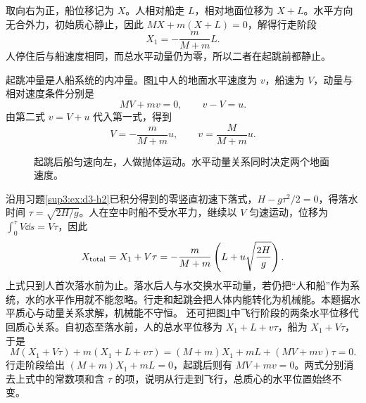 \begin{solution}
取向右为正，船位移记为 $X$。人相对船走 $L$，相对地面位移为 $X+L$。水平方向无合外力，初始质心静止，因此
$MX+m(X+L)=0$，解得行走阶段
\[
X_1=-\frac m{M+m}L.
\]
人停住后与船速度相同，而总水平动量仍为零，所以二者在起跳前都静止。

起跳冲量是人船系统的内冲量。图\ref{sup3:fig:d3-h3-s}中人的地面水平速度为 $v$，船速为 $V$，动量与相对速度条件分别是
\[
MV+mv=0,\qquad v-V=u.
\]
由第二式 $v=V+u$ 代入第一式，得到
\[
V=-\frac{m}{M+m}u,\qquad v=\frac{M}{M+m}u.
\]
\begin{figure}[H]\centering
{}
\caption{起跳后船匀速向左，人做抛体运动。水平动量关系同时决定两个地面速度。}\label{sup3:fig:d3-h3-s}
\end{figure}
沿用习题\ref{sup3:ex:d3-h2}已积分得到的零竖直初速下落式，$H-g\tau^2/2=0$，得落水时间 $\tau=\sqrt{2H/g}$。人在空中时船不受水平力，继续以 $V$ 匀速运动，位移为 $\int_0^\tau V\dd s=V\tau$，因此
\[
X_{\rm total}=X_1+V\tau
=-\frac m{M+m}\left(L+u\sqrt{\frac{2H}g}\right).
\]
上式只到人首次落水前为止。落水后人与水交换水平动量，若仍把“人和船”作为系统，水的水平作用就不能忽略。行走和起跳会把人体内能转化为机械能。本题据水平质心与动量关系求解，机械能不守恒。
还可把图\ref{sup3:fig:d3-h3-s}中飞行阶段的两条水平位移代回质心关系。自初态至落水前，人的总水平位移为 $X_1+L+v\tau$，船为 $X_1+V\tau$，于是
\[
M(X_1+V\tau)+m(X_1+L+v\tau)
=(M+m)X_1+mL+(MV+mv)\tau=0.
\]
行走阶段给出 $(M+m)X_1+mL=0$，起跳后则有 $MV+mv=0$。两式分别消去上式中的常数项和含 $\tau$ 的项，说明从行走到飞行，总质心的水平位置始终不变。

\end{solution}


